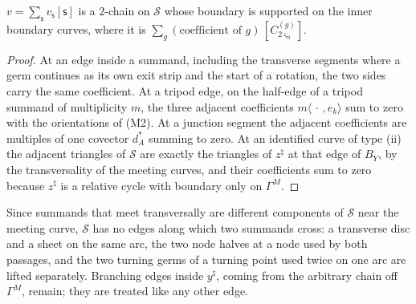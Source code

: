 \begin{lemma}\label{lem:Xichain}
$v=\sum_{\mathsf s} v_{\mathsf s}[\mathsf s]$ is a $2$-chain on $\mathscr S$ whose boundary is supported on the inner boundary curves, where it is
$\sum_g(\text{coefficient of }g)\,[C^{(g)}_{2\varsigma_0}]$.
\end{lemma}

\begin{proof}
At an edge inside a summand, including the transverse segments where a germ continues as its own exit strip and
the start of a rotation, the two sides carry the same coefficient. At a tripod edge, on the half-edge of a tripod
summand of multiplicity $m$, the three adjacent coefficients $m\langle\,\cdot\,,e_k\rangle$ sum to zero with the
orientations of (M2). At a junction segment the adjacent coefficients
are multiples of one covector $d^*_A$ summing to zero. At an identified curve of type (ii) the adjacent triangles of
$\mathscr S$ are exactly the triangles of $z^\natural$ at that edge of $B_Y$, by the transversality of the meeting curves,
and their coefficients sum to zero because $z^\natural$ is a relative cycle with boundary only on $\Gamma^M$.
\end{proof}

Since summands that meet transversally are different components of $\mathscr S$ near the meeting curve, $\mathscr S$
has no edges along which two summands cross: a transverse disc and a sheet on the same arc, the two node halves at a
node used by both passages, and the two turning germs of a turning point used twice on one arc are lifted separately.
Branching edges inside $y^\natural$, coming from the arbitrary chain off $\Gamma^M$, remain; they are treated like any
other edge.

